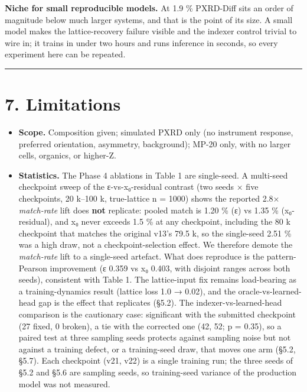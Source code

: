 \documentclass[
  11pt,
]{article}
\providecommand{\tightlist}{%
  \setlength{\itemsep}{0pt}\setlength{\parskip}{0pt}}
\begin{document}
\textbf{Niche for small reproducible models.} At 1.9 \% PXRD-Diff sits
an order of magnitude below much larger systems, and that is the point
of its size. A small model makes the lattice-recovery failure visible
and the indexer control trivial to wire in; it trains in under two hours
and runs inference in seconds, so every experiment here can be repeated.

\begin{center}\rule{0.5\linewidth}{0.5pt}\end{center}

\section{7. Limitations}\label{limitations}

\begin{itemize}
\tightlist
\item
  \textbf{Scope.} Composition given; simulated PXRD only (no instrument
  response, preferred orientation, asymmetry, background); MP-20 only,
  with no larger cells, organics, or higher-Z.
\item
  \textbf{Statistics.} The Phase 4 ablations in Table 1 are single-seed.
  A multi-seed checkpoint sweep of the ε-vs-x₀-residual contrast (two
  seeds × five checkpoints, 20 k--100 k, true-lattice n = 1000) shows
  the reported 2.8× \emph{match-rate} lift does \textbf{not} replicate:
  pooled match is 1.20 \% (ε) vs 1.35 \% (x₀-residual), and x₀ never
  exceeds 1.5 \% at any checkpoint, including the 80 k checkpoint that
  matches the original v13's 79.5 k, so the single-seed 2.51 \% was a
  high draw, not a checkpoint-selection effect. We therefore demote the
  \emph{match-rate} lift to a single-seed artefact. What does reproduce
  is the pattern-Pearson improvement (ε 0.359 vs x₀ 0.403, with disjoint
  ranges across both seeds), consistent with Table 1. The lattice-input
  fix remains load-bearing as a training-dynamics result (lattice loss
  1.0 → 0.02), and the oracle-vs-learned-head gap is the effect that
  replicates (§5.2). The indexer-vs-learned-head comparison is the
  cautionary case: significant with the submitted checkpoint (27 fixed,
  0 broken), a tie with the corrected one (42, 52; p = 0.35), so a
  paired test at three sampling seeds protects against sampling noise
  but not against a training defect, or a training-seed draw, that moves
  one arm (§5.2, §5.7). Each checkpoint (v21, v22) is a single training
  run; the three seeds of §5.2 and §5.6 are sampling seeds, so
  training-seed variance of the production model was not measured.

\end{itemize}
\end{document}
